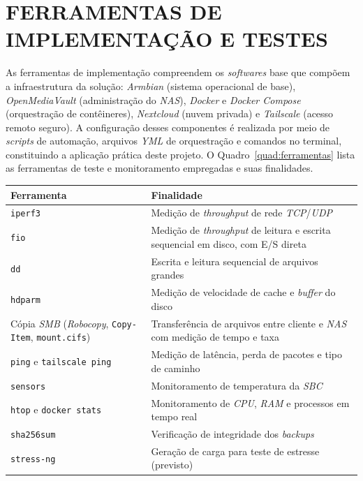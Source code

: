 \section{FERRAMENTAS DE IMPLEMENTAÇÃO E TESTES}

As ferramentas de implementação compreendem os \textit{softwares} base que compõem a infraestrutura da solução: \textit{Armbian} (sistema operacional de base), \textit{OpenMediaVault} (administração do \textit{NAS}), \textit{Docker} e \textit{Docker Compose} (orquestração de contêineres), \textit{Nextcloud} (nuvem privada) e \textit{Tailscale} (acesso remoto seguro). A configuração desses componentes é realizada por meio de \textit{scripts} de automação, arquivos \textit{YML} de orquestração e comandos no terminal, constituindo a aplicação prática deste projeto. O Quadro~\ref{quad:ferramentas} lista as ferramentas de teste e monitoramento empregadas e suas finalidades.

\begin{quadro}[H]
    \centering
    \small
    \begin{tabularx}{\linewidth}{|>{\raggedright\arraybackslash}X|>{\raggedright\arraybackslash}X|}
        \hline
        \textbf{Ferramenta} & \textbf{Finalidade} \\
        \hline
        \hline
        \texttt{iperf3} & Medição de \textit{throughput} de rede \textit{TCP}/\textit{UDP} \\
        \hline
        \texttt{fio} & Medição de \textit{throughput} de leitura e escrita sequencial em disco, com E/S direta \\
        \hline
        \texttt{dd} & Escrita e leitura sequencial de arquivos grandes \\
        \hline
        \texttt{hdparm} & Medição de velocidade de cache e \textit{buffer} do disco \\
        \hline
        Cópia \textit{SMB} (\textit{Robocopy}, \texttt{Copy-Item}, \texttt{mount.cifs}) & Transferência de arquivos entre cliente e \textit{NAS} com medição de tempo e taxa \\
        \hline
        \texttt{ping} e \texttt{tailscale ping} & Medição de latência, perda de pacotes e tipo de caminho \\
        \hline
        \texttt{sensors} & Monitoramento de temperatura da \textit{SBC} \\
        \hline
        \texttt{htop} e \texttt{docker stats} & Monitoramento de \textit{CPU}, \textit{RAM} e processos em tempo real \\
        \hline
        \texttt{sha256sum} & Verificação de integridade dos \textit{backups} \\
        \hline
        \texttt{stress-ng} & Geração de carga para teste de estresse (previsto) \\
        \hline
    \end{tabularx}
    \vspace{0.2cm}
    \fonteautoria
\end{quadro}
